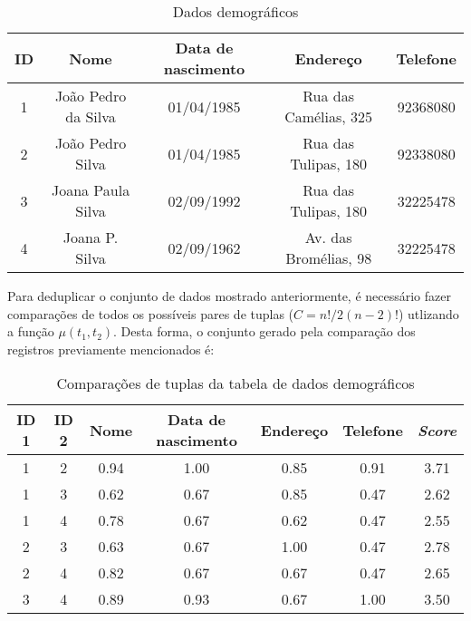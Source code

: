 \documentclass[
	12pt,				%
	openany,			%
	twoside,			%
	a4paper,			%
	brazil,				%
	]{unimontes-ppgmsc-abntex2}
\begin{document}
\begin{table}[!htpb]
    \centering
    \caption{Dados demográficos}
    \label{dataset}
    \begin{tabular}{|c|c|c|c|c|}
        \hline
        \textbf{ID} & \textbf{Nome} & \textbf{Data de nascimento} & \textbf{Endereço} & \textbf{Telefone} \\ \hline
        1 & João Pedro da Silva            & 01/04/1985                                   & Rua das Camélias, 325              & 92368080                           \\ \hline
        2 & João Pedro Silva               & 01/04/1985                                   & Rua das Tulipas, 180               & 92338080                           \\ \hline
        3 & Joana Paula Silva              & 02/09/1992                                   & Rua das Tulipas, 180               & 32225478                           \\ \hline
        4 & Joana P. Silva                 & 02/09/1962                                   & Av. das Bromélias, 98              & 32225478                           \\ \hline
    \end{tabular}
\end{table}

Para deduplicar o conjunto de dados mostrado anteriormente, é necessário fazer comparações de todos os possíveis pares de tuplas ($C = n!/2(n-2)!$) utlizando a função $\mu(t_1,t_2)$. Desta forma, o conjunto gerado pela comparação dos registros previamente mencionados é:

\begin{table}[!htpb]
    \centering
    \caption{Comparações de tuplas da tabela de dados demográficos}
    \label{comparacao}
    \begin{tabular}{|c|c|c|c|c|c|c|}
        \hline
        \textbf{ID 1} & \textbf{ID 2} & \textbf{Nome} & \textbf{Data de nascimento} & \textbf{Endereço} & \textbf{Telefone} & \textbf{\textit{Score}} \\ \hline
        1 & 2 & 0.94 & 1.00 & 0.85 & 0.91 & 3.71 \\ \hline
        1 & 3 & 0.62 & 0.67 & 0.85 & 0.47 & 2.62 \\ \hline
        1 & 4 & 0.78 & 0.67 & 0.62 & 0.47 & 2.55 \\ \hline
        2 & 3 & 0.63 & 0.67 & 1.00 & 0.47 & 2.78 \\ \hline
        2 & 4 & 0.82 & 0.67 & 0.67 & 0.47 & 2.65 \\ \hline
        3 & 4 & 0.89 & 0.93 & 0.67 & 1.00 & 3.50 \\ \hline
    \end{tabular}
\end{table}
\end{document}
